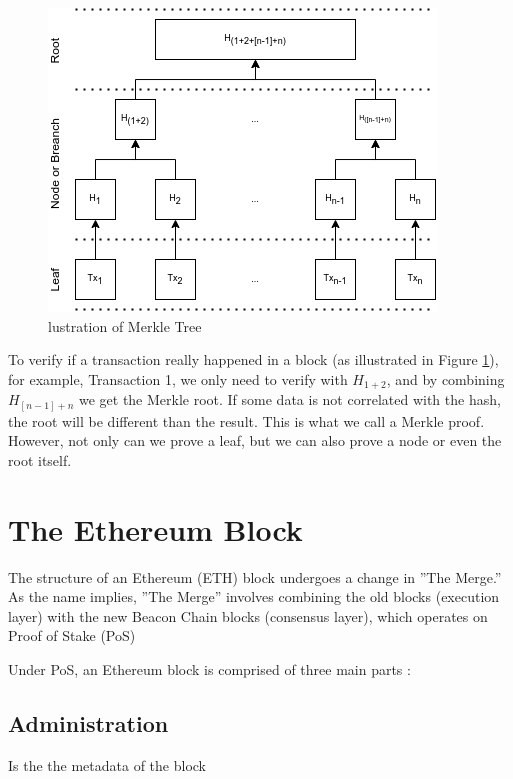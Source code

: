 \documentclass[fleqn,10pt]{olplainarticle}
\begin{document}
\begin{figure}[H]
	\centering
	\includegraphics[width=0.8\linewidth]{"./img/MerkleTree"}
	\caption{lustration of Merkle Tree}
	\label{fig:merkletree}
\end{figure}

To verify if a transaction really happened in a block (as illustrated in Figure \ref{fig:merkletree}), for example, Transaction 1, we only need to verify with \(H_{1+2}\), and by combining \(H_{[n-1]+n}\) we get the Merkle root. If some data is not correlated with the hash, the root will be different than the result. This is what we call a Merkle proof. However, not only can we prove a leaf, but we can also prove a node or even the root itself.



\section{The Ethereum Block}

The structure of an Ethereum (ETH) block undergoes a change in ''The Merge.'' As the name implies, ''The Merge'' involves combining the old blocks (execution layer) with the new Beacon Chain blocks (consensus layer), which operates on Proof of Stake (PoS)   

Under PoS, an Ethereum block is comprised of three main parts \cite{kirshner_ethereumBlock_2023}:

\subsection{Administration}

Is the the metadata of the block
\end{document}
